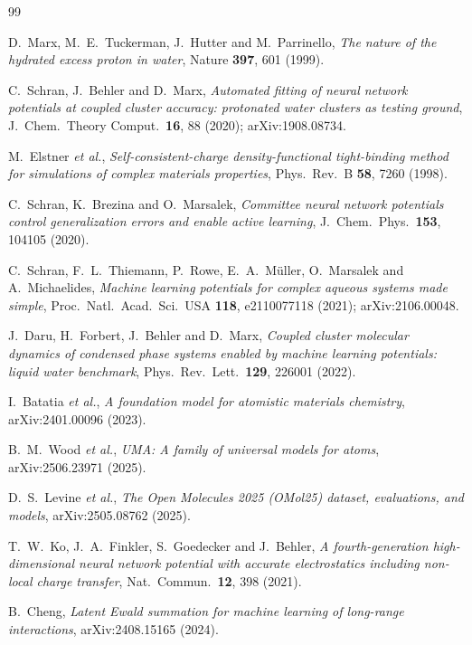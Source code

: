 \documentclass[11pt,a4paper]{article}
\begin{document}
\begin{thebibliography}{99}
\small

 D.~Marx, M.~E.~Tuckerman, J.~Hutter and M.~Parrinello,
  \emph{The nature of the hydrated excess proton in water},
  Nature \textbf{397}, 601 (1999).

 C.~Schran, J.~Behler and D.~Marx,
  \emph{Automated fitting of neural network potentials at coupled cluster
  accuracy: protonated water clusters as testing ground},
  J.\ Chem.\ Theory Comput.\ \textbf{16}, 88 (2020); arXiv:1908.08734.

 M.~Elstner \emph{et al.},
  \emph{Self-consistent-charge density-functional tight-binding method for
  simulations of complex materials properties}, Phys.\ Rev.\ B \textbf{58},
  7260 (1998).

 C.~Schran, K.~Brezina and O.~Marsalek,
  \emph{Committee neural network potentials control generalization errors and
  enable active learning}, J.\ Chem.\ Phys.\ \textbf{153}, 104105 (2020).

 C.~Schran, F.~L.~Thiemann, P.~Rowe, E.~A.~M\"uller,
  O.~Marsalek and A.~Michaelides,
  \emph{Machine learning potentials for complex aqueous systems made simple},
  Proc.\ Natl.\ Acad.\ Sci.\ USA \textbf{118}, e2110077118 (2021);
  arXiv:2106.00048.

 J.~Daru, H.~Forbert, J.~Behler and D.~Marx,
  \emph{Coupled cluster molecular dynamics of condensed phase systems enabled
  by machine learning potentials: liquid water benchmark},
  Phys.\ Rev.\ Lett.\ \textbf{129}, 226001 (2022).

 I.~Batatia \emph{et al.},
  \emph{A foundation model for atomistic materials chemistry},
  arXiv:2401.00096 (2023).

 B.~M.~Wood \emph{et al.},
  \emph{UMA: A family of universal models for atoms}, arXiv:2506.23971 (2025).

 D.~S.~Levine \emph{et al.},
  \emph{The Open Molecules 2025 (OMol25) dataset, evaluations, and models},
  arXiv:2505.08762 (2025).

 T.~W.~Ko, J.~A.~Finkler, S.~Goedecker and J.~Behler,
  \emph{A fourth-generation high-dimensional neural network potential with
  accurate electrostatics including non-local charge transfer},
  Nat.\ Commun.\ \textbf{12}, 398 (2021).

 B.~Cheng,
  \emph{Latent Ewald summation for machine learning of long-range
  interactions}, arXiv:2408.15165 (2024).

\end{thebibliography}
\end{document}
